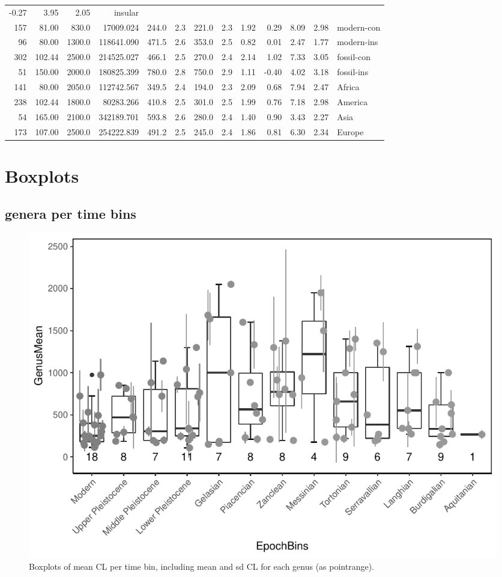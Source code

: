 \documentclass[]{article}
\begin{document}
\begin{longtable}[]{@{}rrrrrrrrrrrrl@{}}
-0.27 & 3.95 & 2.05 & insular\tabularnewline
157 & 81.00 & 830.0 & 17009.024 & 244.0 & 2.3 & 221.0 & 2.3 & 1.92 &
0.29 & 8.09 & 2.98 & modern-con\tabularnewline
96 & 80.00 & 1300.0 & 118641.090 & 471.5 & 2.6 & 353.0 & 2.5 & 0.82 &
0.01 & 2.47 & 1.77 & modern-ins\tabularnewline
302 & 102.44 & 2500.0 & 214525.027 & 466.1 & 2.5 & 270.0 & 2.4 & 2.14 &
1.02 & 7.33 & 3.05 & fossil-con\tabularnewline
51 & 150.00 & 2000.0 & 180825.399 & 780.0 & 2.8 & 750.0 & 2.9 & 1.11 &
-0.40 & 4.02 & 3.18 & fossil-ins\tabularnewline
141 & 80.00 & 2050.0 & 112742.567 & 349.5 & 2.4 & 194.0 & 2.3 & 2.09 &
0.68 & 7.94 & 2.47 & Africa\tabularnewline
238 & 102.44 & 1800.0 & 80283.266 & 410.8 & 2.5 & 301.0 & 2.5 & 1.99 &
0.76 & 7.18 & 2.98 & America\tabularnewline
54 & 165.00 & 2100.0 & 342189.701 & 593.8 & 2.6 & 280.0 & 2.4 & 1.40 &
0.90 & 3.43 & 2.27 & Asia\tabularnewline
173 & 107.00 & 2500.0 & 254222.839 & 491.2 & 2.5 & 245.0 & 2.4 & 1.86 &
0.81 & 6.30 & 2.34 & Europe\tabularnewline
\bottomrule
\end{longtable}

\newpage

\section{Boxplots}\label{boxplots}

\subsection{genera per time bins}\label{genera-per-time-bins}

\begin{figure}[htbp]
\centering
\includegraphics{MA_JJ_files/figure-latex/Boxplots of each genus per time bin-1.pdf}
\caption{Boxplots of mean CL per time bin, including mean and sd CL for
each genus (as pointrange).}
\end{figure}
\end{document}
